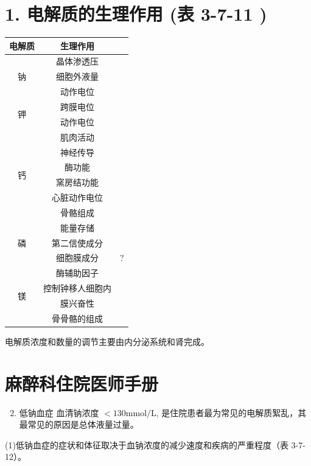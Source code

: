 \documentclass[10pt]{article}
\begin{document}
\section*{1. 电解质的生理作用 (表 3-7-11 )}
\begin{center}
\begin{tabular}{|c|c|c|}
\hline
电解质 & 生理作用 &  \\
\hline
\multirow[t]{3}{*}{钠} & 晶体渗透压 &  \\
\hline
 & 细胞外液量 &  \\
\hline
 & 动作电位 &  \\
\hline
\multirow[t]{2}{*}{钾} & 跨膜电位 &  \\
\hline
 & 动作电位 &  \\
\hline
\multirow[t]{6}{*}{钙} & 肌肉活动 &  \\
\hline
 & 神经传导 &  \\
\hline
 & 酶功能 &  \\
\hline
 & 窯房结功能 &  \\
\hline
 & 心脏动作电位 &  \\
\hline
 & 骨骼组成 &  \\
\hline
\multirow[t]{3}{*}{磷} & 能量存储 &  \\
\hline
 & 第二信使成分 &  \\
\hline
 & 细胞膜成分 & $?$ \\
\hline
\multirow[t]{4}{*}{镁} & 酶辅助因子 &  \\
\hline
 & 控制钟移人细胞内 &  \\
\hline
 & 膜兴奋性 &  \\
\hline
 & 骨骨骼的组成 &  \\
\hline
\end{tabular}
\end{center}

电解质浓度和数量的调节主要由内分泌系统和肾完成。

\section*{麻醉科住院医师手册}
\begin{enumerate}
  \setcounter{enumi}{1}
  \item 低钠血症 血清钠浓度 $<130 \mathrm{mmol} / \mathrm{L}$, 是住院患者最为常见的电解质絮乱，其最常见的原因是总体液量过量。
\end{enumerate}

(1)低钠血症的症状和体征取决于血钠浓度的减少速度和疾病的严重程度（表 3-7-12）。
\end{document}
